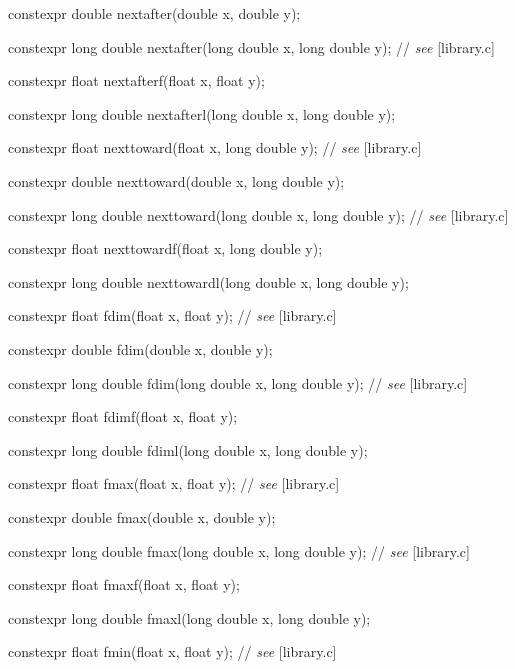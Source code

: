 \documentclass[prd,twocolumn,amsmath,amssymb,nofootinbib,eqsecnum]{revtex4-1}
\newcommand{\highlight}[1]{{\color{red} #1}}
\newcommand{\stdcomment}[1]{{// {\it see} [#1]}}
\begin{document}
{\highlight{constexpr}  double nextafter(double x, double y);

\highlight{constexpr}  long double nextafter(long double x, long double y); \stdcomment{library.c}

\highlight{constexpr}  float nextafterf(float x, float y);

\highlight{constexpr}  long double nextafterl(long double x, long double y);

\vspace{2ex}

\highlight{constexpr}  float nexttoward(float x, long double y); \stdcomment{library.c}

\highlight{constexpr}  double nexttoward(double x, long double y);

\highlight{constexpr}  long double nexttoward(long double x, long double y); \stdcomment{library.c}

\highlight{constexpr}  float nexttowardf(float x, long double y);

\highlight{constexpr}  long double nexttowardl(long double x, long double y);

\vspace{2ex}

\highlight{constexpr}  float fdim(float x, float y); \stdcomment{library.c}

\highlight{constexpr}  double fdim(double x, double y);

\highlight{constexpr}  long double fdim(long double x, long double y); \stdcomment{library.c}

\highlight{constexpr}  float fdimf(float x, float y);

\highlight{constexpr}  long double fdiml(long double x, long double y);

\vspace{2ex}

\highlight{constexpr}  float fmax(float x, float y); \stdcomment{library.c}

\highlight{constexpr}  double fmax(double x, double y);

\highlight{constexpr}  long double fmax(long double x, long double y); \stdcomment{library.c}

\highlight{constexpr}  float fmaxf(float x, float y);

\highlight{constexpr}  long double fmaxl(long double x, long double y);

\vspace{2ex}

\highlight{constexpr} float fmin(float x, float y); \stdcomment{library.c}

}
\end{document}
